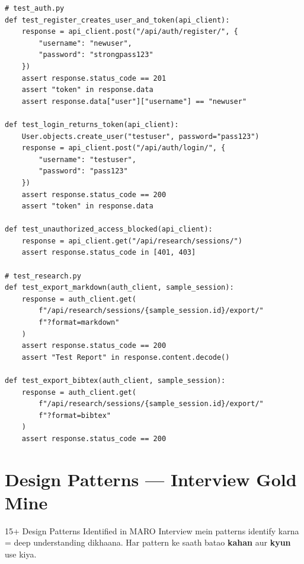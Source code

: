 \documentclass[11pt,a4paper,twoside]{report}
\begin{document}
\begin{lstlisting}[style=pythonstyle,caption={Test Examples}]
# test_auth.py
def test_register_creates_user_and_token(api_client):
    response = api_client.post("/api/auth/register/", {
        "username": "newuser",
        "password": "strongpass123"
    })
    assert response.status_code == 201
    assert "token" in response.data
    assert response.data["user"]["username"] == "newuser"

def test_login_returns_token(api_client):
    User.objects.create_user("testuser", password="pass123")
    response = api_client.post("/api/auth/login/", {
        "username": "testuser",
        "password": "pass123"
    })
    assert response.status_code == 200
    assert "token" in response.data

def test_unauthorized_access_blocked(api_client):
    response = api_client.get("/api/research/sessions/")
    assert response.status_code in [401, 403]

# test_research.py
def test_export_markdown(auth_client, sample_session):
    response = auth_client.get(
        f"/api/research/sessions/{sample_session.id}/export/"
        f"?format=markdown"
    )
    assert response.status_code == 200
    assert "Test Report" in response.content.decode()

def test_export_bibtex(auth_client, sample_session):
    response = auth_client.get(
        f"/api/research/sessions/{sample_session.id}/export/"
        f"?format=bibtex"
    )
    assert response.status_code == 200
\end{lstlisting}



\chapter{Design Patterns --- Interview Gold Mine}

\begin{conceptbox}{15+ Design Patterns Identified in MARO}
Interview mein patterns identify karna = deep understanding dikhaana. Har pattern ke saath batao \textbf{kahan} aur \textbf{kyun} use kiya.
\end{conceptbox}
\end{document}
